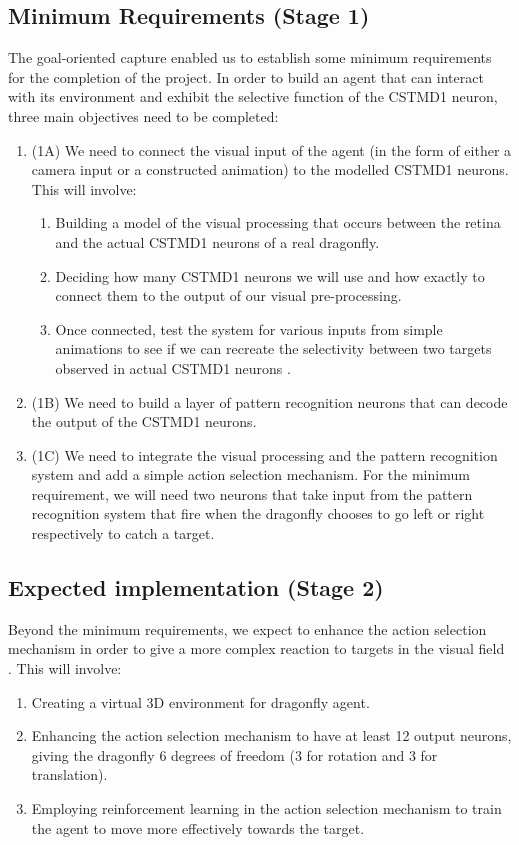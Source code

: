 \documentclass[a4paper,11pt]{article}
\begin{document}
	\subsection{Minimum Requirements (Stage 1)}
	
	The goal-oriented capture enabled us to establish some minimum requirements for the completion of the project. In order to build an agent that can interact with its environment and exhibit the selective function of the CSTMD1 neuron, three main objectives need to be completed:
\begin{enumerate}
	\item (1A) We need to connect the visual input of the agent (in the form 	of either a camera input or a constructed animation) to the modelled CSTMD1 neurons. This will involve:
	\begin{enumerate}
		\item Building a model of the visual processing that occurs between the retina and the actual CSTMD1 neurons of a real dragonfly.
		\item Deciding how many CSTMD1 neurons we will use and how exactly to connect them to the output of our visual pre-processing.
		\item Once connected, test the system for various inputs from simple animations to see if we can recreate the selectivity between two targets observed in actual CSTMD1 neurons \cite{w13}.
	\end{enumerate}
	\item (1B) We need to build a layer of pattern recognition neurons that can decode the output of the CSTMD1 neurons.
	\item (1C) We need to integrate the visual processing and the pattern recognition system and add a simple action selection mechanism. For the minimum requirement, we will need two neurons that take input from the pattern recognition system that fire when the dragonfly chooses to go left or right respectively to catch a target.
\end{enumerate} 
 
 	\subsection{Expected implementation (Stage 2)}
 	
 	Beyond the minimum requirements, we expect to enhance the action selection mechanism in order to give a more complex reaction to targets in the visual field . This will involve:
 \begin{enumerate}
 	\item Creating a virtual 3D environment for dragonfly agent.
 	\item Enhancing the action selection mechanism to have at least 12 output neurons, giving the dragonfly 6 degrees of freedom (3 for rotation and 3 for translation).
 	\item Employing reinforcement learning in the action selection mechanism to train the agent to move more effectively towards the target.
 \end{enumerate}
 
\end{document}
